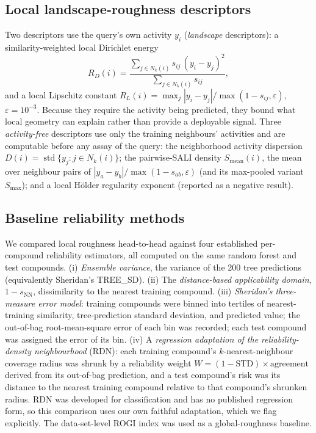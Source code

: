 \documentclass[11pt,letterpaper]{article}
\begin{document}
\subsection*{Local landscape-roughness descriptors}
Two descriptors use the query's own activity $y_i$ (\emph{landscape} descriptors): a similarity-weighted local Dirichlet energy
\begin{equation}
R_D(i) = \frac{\sum_{j \in N_k(i)} s_{ij}\,(y_i - y_j)^2}{\sum_{j \in N_k(i)} s_{ij}},
\end{equation}
and a local Lipschitz constant $R_L(i) = \max_{j} |y_i - y_j| / \max(1 - s_{ij},\varepsilon)$, $\varepsilon = 10^{-3}$. Because they require the activity being predicted, they bound what local geometry can explain rather than provide a deployable signal. Three \emph{activity-free} descriptors use only the training neighbours' activities and are computable before any assay of the query: the neighborhood activity dispersion $D(i) = \operatorname{std}\{y_j : j \in N_k(i)\}$; the pairwise-SALI density $S_{\mathrm{mean}}(i)$, the mean over neighbour pairs of $|y_a - y_b| / \max(1 - s_{ab},\varepsilon)$ (and its max-pooled variant $S_{\max}$)\cite{guha2008}; and a local H\"older regularity exponent (reported as a negative result).

\subsection*{Baseline reliability methods}
We compared local roughness head-to-head against four established per-compound reliability estimators, all computed on the same random forest and test compounds. (i) \emph{Ensemble variance}, the variance of the 200 tree predictions (equivalently Sheridan's TREE\_SD). (ii) The \emph{distance-based applicability domain}, $1 - s_{\mathrm{NN}}$, dissimilarity to the nearest training compound. (iii) \emph{Sheridan's three-measure error model}:\cite{sheridan2012} training compounds were binned into tertiles of nearest-training similarity, tree-prediction standard deviation, and predicted value; the out-of-bag root-mean-square error of each bin was recorded; each test compound was assigned the error of its bin. (iv) A \emph{regression adaptation of the reliability-density neighbourhood} (RDN):\cite{aniceto2016} each training compound's $k$-nearest-neighbour coverage radius was shrunk by a reliability weight $W = (1 - \mathrm{STD}) \times \mathrm{agreement}$ derived from its out-of-bag prediction, and a test compound's risk was its distance to the nearest training compound relative to that compound's shrunken radius. RDN was developed for classification and has no published regression form, so this comparison uses our own faithful adaptation, which we flag explicitly. The data-set-level ROGI index\cite{aldeghi2022} was used as a global-roughness baseline.
\end{document}
